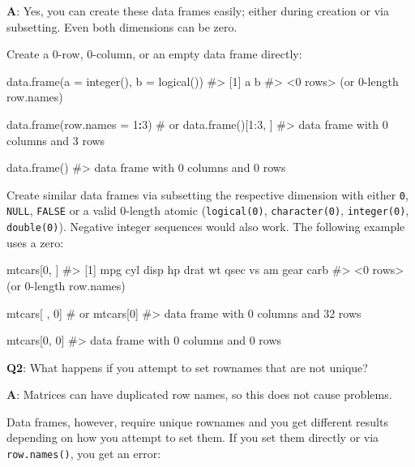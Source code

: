 \documentclass[
]{krantz}
\makeatletter
\newenvironment{Shaded}{\begin{snugshade}}{\end{snugshade}}
\newcommand{\CommentTok}[1]{\textcolor[rgb]{0.56,0.35,0.01}{\textit{#1}}}
\newcommand{\DataTypeTok}[1]{\textcolor[rgb]{0.13,0.29,0.53}{#1}}
\newcommand{\DecValTok}[1]{\textcolor[rgb]{0.00,0.00,0.81}{#1}}
\newcommand{\KeywordTok}[1]{\textcolor[rgb]{0.13,0.29,0.53}{\textbf{#1}}}
\newcommand{\NormalTok}[1]{#1}
\newcommand{\OperatorTok}[1]{\textcolor[rgb]{0.81,0.36,0.00}{\textbf{#1}}}
\newenvironment{kframe}{%
\medskip{}
\setlength{\fboxsep}{.8em}
 \def\at@end@of@kframe{}%
 \ifinner\ifhmode%
  \def\at@end@of@kframe{\end{minipage}}%
  \begin{minipage}{\columnwidth}%
 \fi\fi%
 \def\FrameCommand##1{\hskip\@totalleftmargin \hskip-\fboxsep
 \colorbox{shadecolor}{##1}\hskip-\fboxsep
     \hskip-\linewidth \hskip-\@totalleftmargin \hskip\columnwidth}%
 \MakeFramed {\advance\hsize-\width
   \@totalleftmargin\z@ \linewidth\hsize
   \@setminipage}}%
 {\par\unskip\endMakeFramed%
 \at@end@of@kframe}
\renewenvironment{Shaded}{\begin{kframe}}{\end{kframe}}
\renewcommand{\KeywordTok} [1]{\textcolor[rgb]{0.00,0.44,0.13}{{#1}}}
\renewcommand{\DataTypeTok}[1]{\textcolor[rgb]{0.56,0.13,0.00}{{#1}}}
\renewcommand{\DecValTok}  [1]{\textcolor[rgb]{0.25,0.63,0.44}{{#1}}}
\renewcommand{\CommentTok} [1]{\textcolor[rgb]{0.38,0.63,0.69}{{#1}}}
\renewcommand{\NormalTok}  [1]{{#1}}
\makeatother
\begin{document}
\textbf{{A}}: Yes, you can create these data frames easily; either during creation or via subsetting. Even both dimensions can be zero.

Create a 0-row, 0-column, or an empty data frame directly:

\begin{Shaded}
\begin{Highlighting}[]
\KeywordTok{data.frame}\NormalTok{(}\DataTypeTok{a =} \KeywordTok{integer}\NormalTok{(), }\DataTypeTok{b =} \KeywordTok{logical}\NormalTok{())}
\CommentTok{#> [1] a b}
\CommentTok{#> <0 rows> (or 0-length row.names)}

\KeywordTok{data.frame}\NormalTok{(}\DataTypeTok{row.names =} \DecValTok{1}\OperatorTok{:}\DecValTok{3}\NormalTok{)  }\CommentTok{# or data.frame()[1:3, ]}
\CommentTok{#> data frame with 0 columns and 3 rows}

\KeywordTok{data.frame}\NormalTok{()}
\CommentTok{#> data frame with 0 columns and 0 rows}
\end{Highlighting}
\end{Shaded}

Create similar data frames via subsetting the respective dimension with either \texttt{0}, \texttt{NULL}, \texttt{FALSE} or a valid 0-length atomic (\texttt{logical(0)}, \texttt{character(0)}, \texttt{integer(0)}, \texttt{double(0)}). Negative integer sequences would also work. The following example uses a zero:

\begin{Shaded}
\begin{Highlighting}[]
\NormalTok{mtcars[}\DecValTok{0}\NormalTok{, ]}
\CommentTok{#>  [1] mpg  cyl  disp hp   drat wt   qsec vs   am   gear carb}
\CommentTok{#> <0 rows> (or 0-length row.names)}

\NormalTok{mtcars[ , }\DecValTok{0}\NormalTok{]  }\CommentTok{# or mtcars[0]}
\CommentTok{#> data frame with 0 columns and 32 rows}

\NormalTok{mtcars[}\DecValTok{0}\NormalTok{, }\DecValTok{0}\NormalTok{]}
\CommentTok{#> data frame with 0 columns and 0 rows}
\end{Highlighting}
\end{Shaded}

\textbf{{Q2}}: What happens if you attempt to set rownames that are not unique?

\textbf{{A}}: Matrices can have duplicated row names, so this does not cause problems.

Data frames, however, require unique rownames and you get different results depending on how you attempt to set them. If you set them directly or via \texttt{row.names()}, you
get an error:
\end{document}
